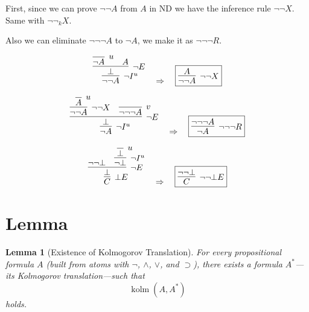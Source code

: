 \documentclass{article}
\newtheorem{lemma}{Lemma}
\begin{document}
First, since we can prove $\neg\neg A$ from $A$ in ND we 
have the inference rule $\neg\neg X$. Same with $\neg\neg_{k}X$.

Also we can eliminate $\neg\neg\neg A$ to $\neg A$, we make 
it as $\neg\neg\neg R$.

\[
\infer[\neg I^{u}]{\neg\neg A}{
    \infer[\neg E]{\bot}{
        \infer [u]{\neg A}{} & A
    }
}
\quad \Rightarrow \quad
\fbox{$
    \infer[\neg \neg X]{\neg \neg A}{ A}
$}
\]

\[
    \infer[\neg I^{u}]{\neg A}{
        \infer[\neg E]{\bot}{ 
              \infer[\neg \neg X]{\neg \neg A}{\infer[u]{A}{}} &
              \infer[v]{\neg \neg \neg A}{}
        }
      }
\quad \Rightarrow \quad
\fbox{$
    \infer [\neg \neg \neg R]
    {\neg A}
    {\neg\neg \neg A} 
$}
\]

\[
\infer[\bot E]{C}{
  \infer[\neg E]{\bot}{
    \neg\neg\bot
    &
    \infer[\neg I^{u}]{\neg\bot}{
      \infer[u]{\bot}{}
    }
  }
}
\quad \Rightarrow \quad
\fbox{$
  \infer[\neg\neg\bot E]{C}{\neg\neg\bot}
$}
\]


\section{Lemma}
\begin{lemma}[Existence of Kolmogorov Translation]\label{lem:exists-kolm}
  For every propositional formula $A$ (built from atoms with
  $\neg$, $\land$, $\lor$, and $\supset$), there exists a formula
  $A^{\!*}$—its Kolmogorov translation—such that
  \[
    \operatorname{kolm}(A,A^{\!*})
  \]
  holds.
  \end{lemma}
  
\end{document}
